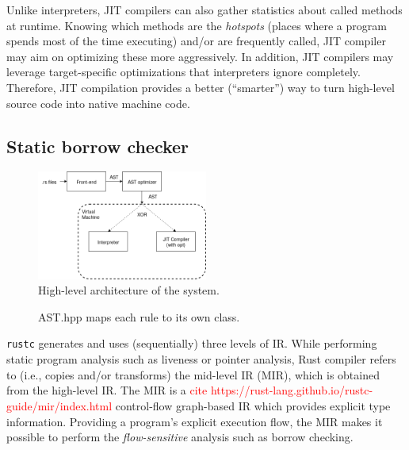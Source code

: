 Unlike interpreters, JIT compilers can also gather statistics about
called methods at runtime. Knowing which methods are the \textit{hotspots} (places
where a program spends most of the time executing) and/or are frequently called,
JIT compiler may aim on optimizing these more aggressively. In addition,
JIT compilers may leverage target-specific optimizations that interpreters 
ignore completely. Therefore, JIT compilation provides a better (``smarter'')
way to turn high-level source code into native machine code.

%

\subsection{Static borrow checker}
{%
\begin{figure}
        \includegraphics[width=0.5\textwidth]{architecture.png}
    \caption{High-level architecture of the system.}
    \label{arch1}
\end{figure}
}
\begin{figure}[ht]
    \begin{center}
        
    \end{center}
    \caption{AST.hpp maps each rule to its own class.}
    \label{cpp1}
\end{figure}

\texttt{rustc} generates and uses (sequentially) three levels of IR. While
performing static program analysis such as liveness or pointer analysis, Rust
compiler refers to (i.e., copies and/or transforms) the mid-level IR (MIR),
which is obtained from the high-level IR. The MIR is a \textcolor{red}{ cite
https://rust-lang.github.io/rustc-guide/mir/index.html}  control-flow
graph-based IR which provides explicit type information. Providing a program's
explicit execution flow, the MIR makes it possible to perform the
\textit{flow-sensitive} analysis such as borrow checking.

